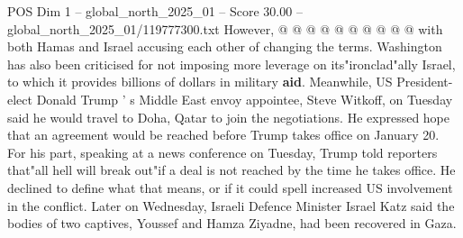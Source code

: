 \begin{textsample}{POS Dim 1 – global\_north\_2025\_01 – Score 30.00 – global\_north\_2025\_01/119777300.txt}
However, @ @ @ @ @ @ @ @ @ @ with both Hamas and Israel accusing each other of changing the terms.
Washington has also been criticised for not imposing more leverage on its"ironclad"ally Israel, to which it provides billions of dollars in military \textbf{aid}.
Meanwhile, US President-elect Donald Trump ' s Middle East envoy appointee, Steve Witkoff, on Tuesday said he would travel to Doha, Qatar to join the negotiations.
He expressed hope that an agreement would be reached before Trump takes office on January 20.
For his part, speaking at a news conference on Tuesday, Trump told reporters that"all hell will break out"if a deal is not reached by the time he takes office.
He declined to define what that means, or if it could spell increased US involvement in the conflict.
Later on Wednesday, Israeli Defence Minister Israel Katz said the bodies of two captives, Youssef and Hamza Ziyadne, had been recovered in Gaza.

\end{textsample}
